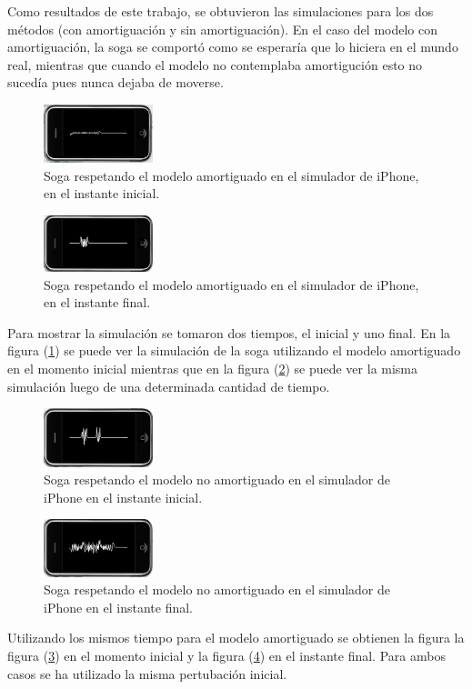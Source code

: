 \documentclass[11pt,a4paper]{emulateapj}
\begin{document}
Como resultados de este trabajo, se obtuvieron las simulaciones para los dos métodos (con amortiguación y sin amortiguación). En el caso del modelo con amortiguación, la soga se comportó como se esperaría que lo hiciera en el mundo real, mientras que cuando el modelo no contemplaba amortigución esto no sucedía pues nunca dejaba de moverse.  
\begin{figure}[ht!]
     \includegraphics[width=120px]{images/amortInit.png}
      \caption{Soga respetando el modelo amortiguado en el simulador de iPhone, en el instante inicial.}
     \label{fig:amortInit}
\end{figure} 
\begin{figure}[ht!]
     \includegraphics[width=120px]{images/amortFinal.png}
      \caption{Soga respetando el modelo amortiguado en el simulador de iPhone, en el instante final.}
     \label{fig:amortFinal}
\end{figure}
 
Para mostrar la simulación se tomaron dos tiempos, el inicial y uno final. En la figura (\ref{fig:amortInit}) se puede ver la simulación de la soga utilizando el modelo amortiguado en el momento inicial mientras que en la figura (\ref{fig:amortFinal}) se puede ver la misma simulación luego de una determinada cantidad de tiempo.

\begin{figure}[ht!]
     \includegraphics[width=120px]{images/sinamortInit.png}
      \caption{Soga respetando el modelo no amortiguado en el simulador de iPhone en el instante inicial.}
     \label{fig:sinamortInit}
\end{figure}
\begin{figure}[ht!]
     \includegraphics[width=120px]{images/sinamortFinal.png}
      \caption{Soga respetando el modelo no amortiguado en el simulador de iPhone en el instante final.}
     \label{fig:sinamortFinal}
\end{figure}

Utilizando los mismos tiempo para el modelo amortiguado se obtienen la figura la figura (\ref{fig:sinamortInit}) en el momento inicial y la figura (\ref{fig:sinamortFinal}) en el instante final.  Para ambos casos se ha utilizado la misma pertubación inicial.
 

%
%

\end{document}
